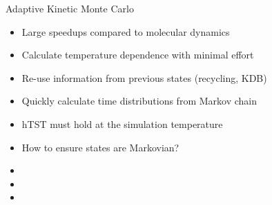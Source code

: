 \documentclass[onlymath]{beamer}
\begin{document}
\begin{frame}{Adaptive Kinetic Monte Carlo}
  \begin{tcolorbox}[title=Pros,colback=white,colframe=green!50!black,]
    \begin{itemize}
      \item Large speedups compared to molecular dynamics
      \item Calculate temperature dependence with minimal effort
      \item Re-use information from previous states (recycling, KDB)
      \item Quickly calculate time distributions from Markov chain
    \end{itemize}
  \end{tcolorbox}

  \vspace{1mm}

  \begin{tcolorbox}[title=Cons,colback=white,colframe=red!50!black,]
    \begin{itemize}
      \item hTST must hold at the simulation temperature
      \item How to ensure states are Markovian?
      \item {}
      \item {}
      \item {}
    \end{itemize}
  \end{tcolorbox}
\end{frame}
\end{document}
